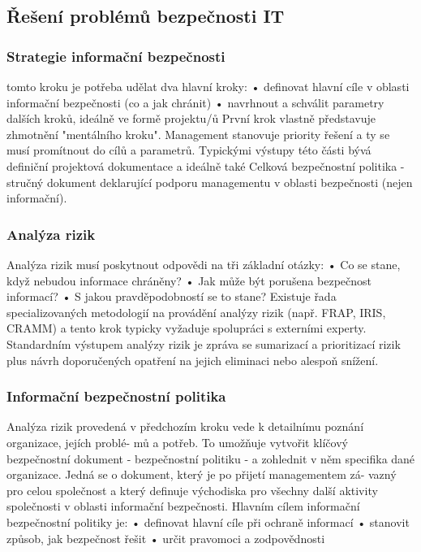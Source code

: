 \documentclass{article}
\begin{document}
\subsection{Řešení problémů bezpečnosti IT}
\subsubsection{Strategie informační bezpečnosti}
tomto kroku je potřeba udělat dva hlavní kroky: \newline
• definovat hlavní cíle v oblasti informační bezpečnosti (co a jak chránit)\newline
• navrhnout a schválit parametry dalších kroků, ideálně ve formě projektu/ů\newline
První krok vlastně představuje zhmotnění "mentálního kroku". Management stanovuje priority
řešení a ty se musí promítnout do cílů a parametrů. Typickými výstupy této části bývá definiční
projektová dokumentace a ideálně také Celková bezpečnostní politika - stručný dokument deklarující
podporu managementu v oblasti bezpečnosti (nejen informační).
\subsubsection{Analýza rizik}
Analýza rizik musí poskytnout odpovědi na tři základní otázky:\newline
• Co se stane, když nebudou informace chráněny?\newline
• Jak může být porušena bezpečnost informací?\newline
• S jakou pravděpodobností se to stane?\newline
Existuje řada specializovaných metodologií na provádění analýzy rizik (např. FRAP, IRIS,
CRAMM) a tento krok typicky vyžaduje spolupráci s externími experty. Standardním výstupem analýzy
rizik je zpráva se sumarizací a prioritizací rizik plus návrh doporučených opatření na jejich eliminaci
nebo alespoň snížení.
\subsubsection{Informační bezpečnostní politika}
Analýza rizik provedená v předchozím kroku vede k detailnímu poznání organizace, jejích problé-
mů a potřeb. To umožňuje vytvořit klíčový bezpečnostní dokument - bezpečnostní politiku - a zohlednit
v něm specifika dané organizace. Jedná se o dokument, který je po přijetí managementem zá-
vazný pro celou společnost a který definuje východiska pro všechny další aktivity společnosti v oblasti
informační bezpečnosti. Hlavním cílem informační bezpečnostní politiky je:\newline
• definovat hlavní cíle při ochraně informací \newline
• stanovit způsob, jak bezpečnost řešit \newline
• určit pravomoci a zodpovědnosti \newline
\end{document}
